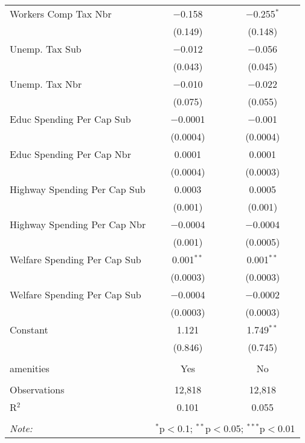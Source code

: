 \begin{table}[!htbp]
\begin{tabular}{@{\extracolsep{5pt}}lcc}
  Workers Comp Tax Nbr & $-$0.158 & $-$0.255$^{*}$ \\ 
  & (0.149) & (0.148) \\ 
  Unemp. Tax Sub & $-$0.012 & $-$0.056 \\ 
  & (0.043) & (0.045) \\ 
  Unemp. Tax Nbr & $-$0.010 & $-$0.022 \\ 
  & (0.075) & (0.055) \\ 
  Educ Spending Per Cap Sub & $-$0.0001 & $-$0.001 \\ 
  & (0.0004) & (0.0004) \\ 
  Educ Spending Per Cap Nbr & 0.0001 & 0.0001 \\ 
  & (0.0004) & (0.0003) \\ 
  Highway Spending Per Cap Sub & 0.0003 & 0.0005 \\ 
  & (0.001) & (0.001) \\ 
  Highway Spending Per Cap Nbr & $-$0.0004 & $-$0.0004 \\ 
  & (0.001) & (0.0005) \\ 
  Welfare Spending Per Cap Sub & 0.001$^{**}$ & 0.001$^{**}$ \\ 
  & (0.0003) & (0.0003) \\ 
  Welfare Spending Per Cap Sub & $-$0.0004 & $-$0.0002 \\ 
  & (0.0003) & (0.0003) \\ 
  Constant & 1.121 & 1.749$^{**}$ \\ 
  & (0.846) & (0.745) \\ 
 \hline \\[-1.8ex] 
amenities & Yes & No \\ 
\hline \\[-1.8ex] 
Observations & 12,818 & 12,818 \\ 
R$^{2}$ & 0.101 & 0.055 \\ 
\hline 
\hline \\[-1.8ex] 
\textit{Note:}  & \multicolumn{2}{r}{$^{*}$p$<$0.1; $^{**}$p$<$0.05; $^{***}$p$<$0.01} \\ 
\end{tabular} 
\end{table} 
